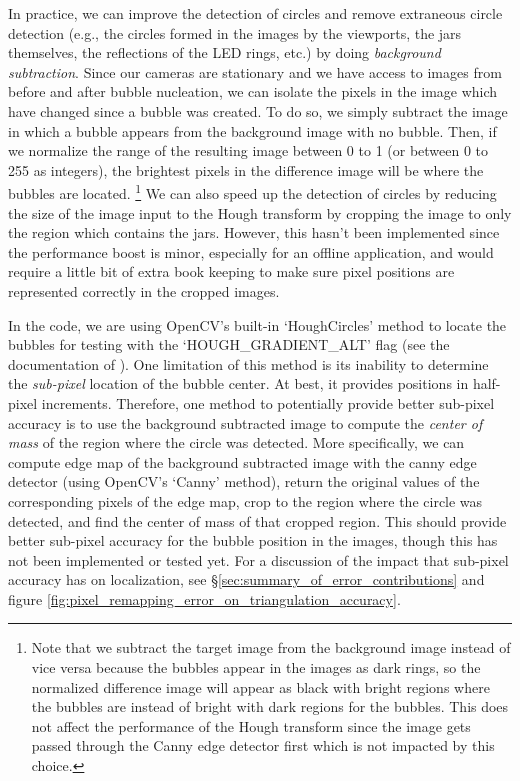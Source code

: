 \documentclass[11pt, letterpaper]{extarticle} %
\begin{document}
In practice, we can improve the detection of circles and remove extraneous circle detection (e.g., the circles formed in the images by the viewports, the jars themselves, the reflections of the LED rings, etc.) by doing \textit{background subtraction}. Since our cameras are stationary and we have access to images from before and after bubble nucleation, we can isolate the pixels in the image which have changed since a bubble was created. To do so, we simply subtract the image in which a bubble appears from the background image with no bubble. Then, if we normalize the range of the resulting image between 0 to 1 (or between 0 to 255 as integers), the brightest pixels in the difference image will be where the bubbles are located. \footnote{Note that we subtract the target image from the background image instead of vice versa because the bubbles appear in the images as dark rings, so the normalized difference image will appear as black with bright regions where the bubbles are instead of bright with dark regions for the bubbles. This does not affect the performance of the Hough transform since the image gets passed through the Canny edge detector first which is not impacted by this choice.} We can also speed up the detection of circles by reducing the size of the image input to the Hough transform by cropping the image to only the region which contains the jars. However, this hasn't been implemented since the performance boost is minor, especially for an offline application, and would require a little bit of extra book keeping to make sure pixel positions are represented correctly in the cropped images.

In the code, we are using OpenCV's built-in `HoughCircles' method to locate the bubbles for testing with the `HOUGH\_GRADIENT\_ALT' flag (see the documentation of \cite{opencv_library}). One limitation of this method is its inability to determine the \textit{sub-pixel} location of the bubble center. At best, it provides positions in half-pixel increments. Therefore, one method to potentially provide better sub-pixel accuracy is to use the background subtracted image to compute the \textit{center of mass} of the region where the circle was detected. More specifically, we can compute edge map of the background subtracted image with the canny edge detector (using OpenCV's `Canny' method), return the original values of the corresponding pixels of the edge map, crop to the region where the circle was detected, and find the center of mass of that cropped region. This should provide better sub-pixel accuracy for the bubble position in the images, though this has not been implemented or tested yet. For a discussion of the impact that sub-pixel accuracy has on localization, see \S\ref{sec:summary_of_error_contributions} and figure \ref{fig:pixel_remapping_error_on_triangulation_accuracy}.
\end{document}
